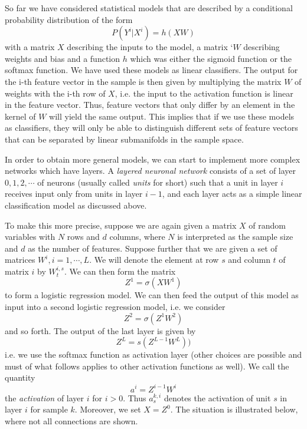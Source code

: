\documentclass[a4paper, draft]{report}
\numberwithin{section}{chapter}
\numberwithin{equation}{chapter}
\theoremstyle{own}
\theoremstyle{remark}
\begin{document}
So far we have considered statistical models that are described by a conditional probability distribution of the form
$$
P (Y^i| X^i ) = h(XW)
$$
with a matrix $X$ describing the inputs to the model, a matrix `$W$ describing weights and bias and a function $h$ which was either the sigmoid function or the softmax function. We have used these models as linear classifiers. The output for the i-th feature vector in the sample is then given by multiplying the matrix $W$ of weights with the i-th row of $X$, i.e. the input to the activation function is linear in the feature vector. Thus, feature vectors that only differ by an element in the kernel of $W$ will yield the same output. This implies that if we use these models as classifiers, they will only be able to distinguish different sets of feature vectors that can be separated by linear submanifolds in the sample space.

In order to obtain more general models, we can start to implement more complex networks which have layers. A {\em layered neuronal network} consists of a set of layer $0, 1, 2, \cdots$ of neurons (usually called {\em units} for short) such that a unit in layer $i$ receives input only from units in layer $i-1$, and each layer acts as a simple linear classification model as discussed above.

To make this more precise, suppose we are again given a matrix $X$ of random variables with $N$ rows and $d$ columns, where $N$ is interpreted as the sample size and $d$ as the number of features. Suppose further that we are given a set of matrices $W^i, i = 1, \cdots, L$. We will denote the element at row $s$ and column $t$ of matrix $i$ by $W^{i,s}_t$.  We can then form the matrix
$$
Z^1 = \sigma(X W^1) 
$$
to form a logistic regression model. We can then feed the output of this model as input into a second logistic regression model, i.e. we consider
$$
Z^2 = \sigma(Z^1 W^2)
$$
and so forth. The output of the last layer is given by 
$$
Z^L = s(Z^{L-1} W^L) )
$$
i.e. we use the softmax function as activation layer (other choices are possible and must of what follows applies to other activation functions as well). We call the quantity
$$
a^i = Z^{i-1} W^i
$$
the {\em activation} of layer $i$ for $i > 0$. Thus $a^{k,i}_s$ denotes the activation of unit $s$ in layer $i$ for sample $k$. Moreover, we set $X=Z^0$. The situation is illustrated below, where not all connections are shown.
\end{document}
